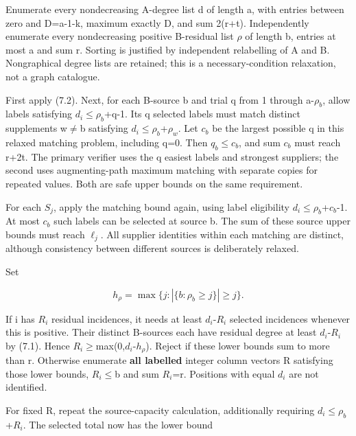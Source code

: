 \documentclass[
  11pt,
]{article}
\begin{document}
Enumerate every nondecreasing A-degree list d of length a, with entries
between zero and D=a-1-k, maximum exactly D, and sum 2(r+t).
Independently enumerate every nondecreasing positive B-residual list
\ensuremath{\rho} of length b, entries at most a and sum r. Sorting is
justified by independent relabelling of A and B. Nongraphical degree
lists are retained; this is a necessary-condition relaxation, not a
graph catalogue.

First apply (7.2). Next, for each B-source b and trial q from 1 through
a-\ensuremath{\rho _b}, allow labels satisfying
\ensuremath{d_i}\ensuremath{\le}\ensuremath{\rho _b}+q-1. Its q selected
labels must match distinct supplements w\ensuremath{\ne}b satisfying
\ensuremath{d_i}\ensuremath{\le}\ensuremath{\rho _b}+\ensuremath{\rho _w}.
Let \ensuremath{c_b} be the largest possible q in this relaxed matching
problem, including q=0. Then
\ensuremath{q_b}\ensuremath{\le}\ensuremath{c_b}, and sum
\ensuremath{c_b} must reach r+2t. The primary verifier uses the q
easiest labels and strongest suppliers; the second uses augmenting-path
maximum matching with separate copies for repeated values. Both are safe
upper bounds on the same requirement.

For each \ensuremath{S_j}, apply the matching bound again, using label
eligibility
\ensuremath{d_i}\ensuremath{\le}\ensuremath{\rho _b}+\ensuremath{c_b}-1.
At most \ensuremath{c_b} such labels can be selected at source b. The
sum of these source upper bounds must reach \ensuremath{\ell _j}. All
supplier identities within each matching are distinct, although
consistency between different sources is deliberately relaxed.

Set

\[
h_\rho =\max\{j:|\{b:\rho _b\ge j\}|\ge j\}.
\]

If i has \ensuremath{R_i} residual incidences, it needs at least
\ensuremath{d_i}-\ensuremath{R_i} selected incidences whenever this is
positive. Their distinct B-sources each have residual degree at least
\ensuremath{d_i}-\ensuremath{R_i} by (7.1). Hence
\ensuremath{R_i}\ensuremath{\ge}max(0,\ensuremath{d_i}-\ensuremath{h_\rho}).
Reject if these lower bounds sum to more than r. Otherwise enumerate
\textbf{all labelled} integer column vectors R satisfying those lower
bounds, \ensuremath{R_i}\ensuremath{\le}b and sum \ensuremath{R_i}=r.
Positions with equal \ensuremath{d_i} are not identified.

For fixed R, repeat the source-capacity calculation, additionally
requiring
\ensuremath{d_i}\ensuremath{\le}\ensuremath{\rho _b}+\ensuremath{R_i}.
The selected total now has the lower bound
\end{document}
